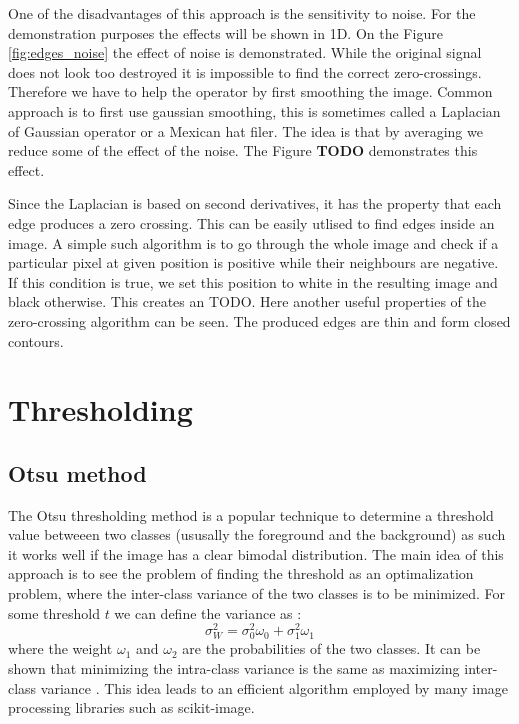 \documentclass[
  digital,     %
  oneside,     %
  nosansbold,  %
  nocolorbold, %
  lof,         %
  lot,         %
]{fithesis4}
\begin{document}
One of the disadvantages of this approach is the sensitivity to noise. For the
demonstration purposes the effects will be shown in 1D. On the Figure
\ref{fig:edges_noise} the effect of noise is demonstrated. While the original
signal does not look too destroyed it is impossible to find the correct
zero-crossings. Therefore we have to help the operator by first smoothing the
image. Common approach is to first use gaussian smoothing, this is sometimes
called a Laplacian of Gaussian operator or a Mexican hat filer. The idea is that
by averaging we reduce some of the effect of the noise. The Figure \textbf{TODO}
demonstrates this effect.

Since the Laplacian is based on second derivatives, it has the property that
each edge produces a zero crossing. This can be easily utlised to find edges
inside an image. A simple such algorithm is to go through the whole image and
check if a particular pixel at given position is positive while their neighbours
are negative. If this condition is true, we set this position to white in the
resulting image and black otherwise. This creates an TODO. Here another useful
properties of the zero-crossing algorithm can be seen. The produced edges are
thin and form closed contours.

\section{Thresholding}

\subsection{Otsu method}

The Otsu thresholding method is a popular technique to determine a threshold
value betweeen two classes (ususally the foreground and the background) as such
it works well if the image has a clear bimodal distribution. The main idea of
this approach is to see the problem of finding the threshold as an
optimalization problem, where the inter-class variance of the two classes is to
be minimized. For some threshold $t$ we can define the variance as
\parencite{otsu1979}:
$$\sigma^2_W = \sigma^2_0 \omega_0 + \sigma^2_1 \omega_1$$  %
where the weight $\omega_1$ and $\omega_2$ are the probabilities of the two classes. It
can be shown that minimizing the intra-class variance is the same as maximizing
inter-class variance \parencite{otsu1979}. This idea leads to an efficient
algorithm employed by many image processing libraries such as scikit-image.
\end{document}
